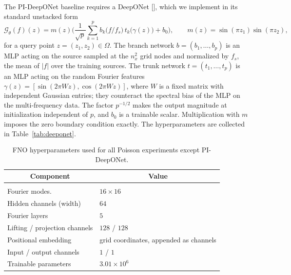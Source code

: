 \documentclass{article} %
\begin{document}
The PI-DeepONet baseline requires a DeepONet [], which we implement in its standard unstacked form
\begin{equation}\label{eq:appendix_deeponet}
   \mathcal G_\theta(f)(z) = m(z)\Big( \frac{1}{\sqrt p}\sum_{k=1}^{p} b_k\big(f/f_s\big)\, t_k\big(\gamma(z)\big) + b_0 \Big),
   \qquad m(z) = \sin(\pi z_1)\sin(\pi z_2),
\end{equation}
for a query point $z = (z_1, z_2)\in\Omega$. The branch network $b = (b_1,\dots,b_p)$ is an MLP acting on the source sampled at the $n_x^2$ grid nodes and normalized by $f_s$, the mean of $|f|$ over the training sources. The trunk network $t = (t_1,\dots,t_p)$ is an MLP acting on the random Fourier features $\gamma(z) = [\sin(2\pi W z), \cos(2\pi W z)]$, where $W$ is a fixed matrix with independent Gaussian entries; they counteract the spectral bias of the MLP on the multi-frequency data. The factor $p^{-1/2}$ makes the output magnitude at initialization independent of $p$, and $b_0$ is a trainable scalar. Multiplication with $m$ imposes the zero boundary condition exactly. The hyperparameters are collected in Table~\ref{tab:deeponet}.

\begin{table}[htb]
   \caption{FNO hyperparameters used for all Poisson experiments except PI-DeepONet.}
   \label{tab:fno}
   \begin{center}
   \begin{tabular}{ll}
      \multicolumn{1}{c}{\bf Component} & \multicolumn{1}{c}{\bf Value} \\ \hline \\
      Fourier modes.             & $16\times16$ \\
      Hidden channels (width)    & $64$ \\
      Fourier layers             & $5$ \\
      Lifting / projection channels & $128$ / $128$ \\
      Positional embedding       & grid coordinates, appended as channels \\
      Input / output channels    & $1$ / $1$ \\
      Trainable parameters       & $3.01\times10^{6}$ \\
   \end{tabular}
   \end{center}
\end{table}
\end{document}
